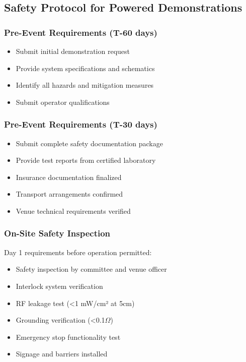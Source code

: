 \subsection{Safety Protocol for Powered Demonstrations}

\subsubsection{Pre-Event Requirements (T-60 days)}
\begin{itemize}[noitemsep]
    \item Submit initial demonstration request
    \item Provide system specifications and schematics
    \item Identify all hazards and mitigation measures
    \item Submit operator qualifications
\end{itemize}

\subsubsection{Pre-Event Requirements (T-30 days)}
\begin{itemize}[noitemsep]
    \item Submit complete safety documentation package
    \item Provide test reports from certified laboratory
    \item Insurance documentation finalized
    \item Transport arrangements confirmed
    \item Venue technical requirements verified
\end{itemize}

\subsubsection{On-Site Safety Inspection}
Day 1 requirements before operation permitted:
\begin{itemize}[noitemsep]
    \item Safety inspection by committee and venue officer
    \item Interlock system verification
    \item RF leakage test (<1 mW/cm² at 5cm)
    \item Grounding verification (<0.1$\Omega$)
    \item Emergency stop functionality test
    \item Signage and barriers installed
\end{itemize}

